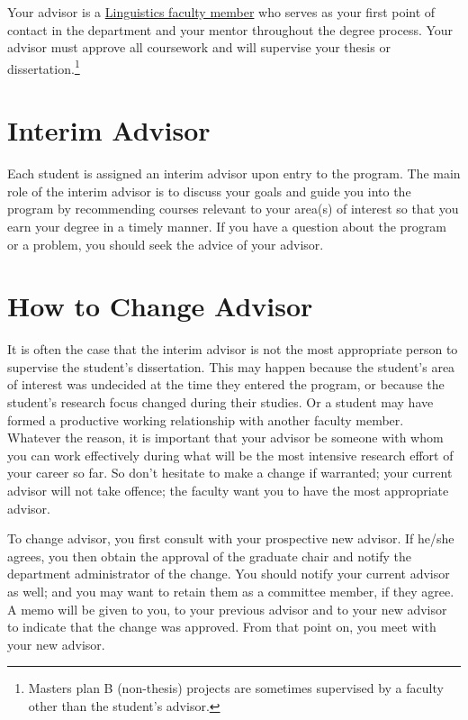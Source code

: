\documentclass[
]{book}
\begin{document}
Your advisor is a \href{https://manoa.hawaii.edu/linguistics/people/}{Linguistics faculty member} who serves as your first point of contact in the department and your mentor throughout the degree process. Your advisor must approve all coursework and will supervise your thesis or dissertation.\footnote{Masters plan B (non-thesis) projects are sometimes supervised by a faculty other than the student's advisor.}

\section{Interim Advisor}\label{interim-advisor}

Each student is assigned an interim advisor upon entry to the program. The main role of the interim advisor is to discuss your goals and guide you into the program by recommending courses relevant to your area(s) of interest so that you earn your degree in a timely manner. If you have a question about the program or a problem, you should seek the advice of your advisor.

\section{How to Change Advisor}\label{how-to-change-advisor}

It is often the case that the interim advisor is not the most appropriate person to supervise the student's dissertation. This may happen because the student's area of interest was undecided at the time they entered the program, or because the student's research focus changed during their studies. Or a student may have formed a productive working relationship with another faculty member. Whatever the reason, it is important that your advisor be someone with whom you can work effectively during what will be the most intensive research effort of your career so far. So don't hesitate to make a change if warranted; your current advisor will not take offence; the faculty want you to have the most appropriate advisor.

To change advisor, you first consult with your prospective new advisor. If he/she agrees, you then obtain the approval of the graduate chair and notify the department administrator of the change. You should notify your current advisor as well; and you may want to retain them as a committee member, if they agree. A memo will be given to you, to your previous advisor and to your new advisor to indicate that the change was approved. From that point on, you meet with your new advisor.
\end{document}
